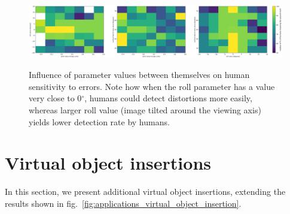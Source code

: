 \begin{figure}[!ht]
\centering
\includegraphics[width=\linewidth]{study_results/hist2d_image_units_value_value.png}\\
\caption{Influence of parameter values between themselves on human
sensitivity to errors. Note how when the roll parameter has a value very
close to 0$^\circ$, humans could detect distortions more easily, whereas larger
roll value (image tilted around the viewing axis) yields lower detection
rate by humans.}
\end{figure}

\FloatBarrier

\protect\hypertarget{voi}{}{}

\hypertarget{virtual-object-insertions}{%
\section{Virtual object insertions}\label{virtual-object-insertions}}

In this section, we present additional virtual object insertions,
extending the results shown in fig.~\ref{fig:applications_virtual_object_insertion}.


